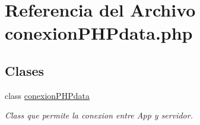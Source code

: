 \hypertarget{conexionPHPdata_8php}{\section{Referencia del Archivo conexion\-P\-H\-Pdata.\-php}
\label{conexionPHPdata_8php}
}
\subsection*{Clases}
\begin{DoxyCompactItemize}
\item 
class \hyperlink{classconexionPHPdata}{conexion\-P\-H\-Pdata}
\begin{DoxyCompactList}\small\item\em Class que permite la conexion entre App y servidor. \end{DoxyCompactList}\end{DoxyCompactItemize}
